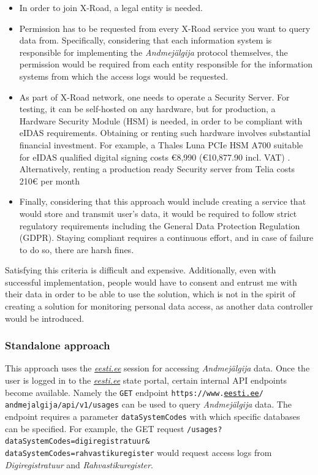 \begin{itemize}
    \item {In order to join X-Road, a legal entity is needed.}
    \item {Permission has to be requested from every X-Road service you want to query data from. Specifically, considering that each information system is responsible for implementing the \textit{Andmejälgija} protocol themselves, the permission would be required from each entity responsible for the information systems from which the access logs would be requested.}
    \item {As part of X-Road network, one needs to operate a Security Server. For testing, it can be self-hosted on any hardware, but for production, a Hardware Security Module (HSM) is needed, in order to be compliant with eIDAS requirements. Obtaining or renting such hardware involves substantial financial investment. For example, a Thales Luna PCIe HSM A700 suitable for eIDAS qualified digital signing costs €8,990 (€10,877.90 incl. VAT) \cite{thales-luna-hsm-pricing}. Alternatively, renting a production ready Security server from Telia costs 210€ per month \cite{telia-xroad-server}}
    \item {Finally, considering that this approach would include creating a service that would store and transmit user's data, it would be required to follow strict regulatory requirements including the General Data Protection Regulation (GDPR). Staying compliant requires a continuous effort, and in case of failure to do so, there are harsh fines.}
\end{itemize}

Satisfying this criteria is difficult and expensive. Additionally, even with successful implementation, people would have to consent and entrust me with their data in order to be able to use the solution, which is not in the spirit of creating a solution for monitoring personal data access, as another data controller would be introduced.

\subsubsection{Standalone approach}
This approach uses the \textit{\href{https://www.eesti.ee}{eesti.ee}} session for accessing \textit{Andmejälgija} data. Once the user is logged in to the \textit{\href{https://www.eesti.ee}{eesti.ee}} state portal, certain internal API endpoints become available. Namely the \texttt{GET} endpoint \texttt{https://www.\href{https://www.eesti.ee}{eesti.ee}/\\andmejalgija/api/v1/usages} can be used to query \textit{Andmejälgija} data. The endpoint requires a parameter \texttt{dataSystemCodes} with which specific databases can be specified. For example, the GET request \texttt{/usages?dataSystemCodes=digiregistratuur\&\\dataSystemCodes=rahvastikuregister} would request access logs from \textit{Digiregistratuur} and \textit{Rahvastikuregister}.

